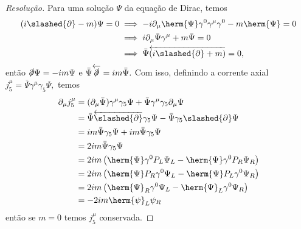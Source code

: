 \begin{proof}[Resolução]
    Para uma solução \(\Psi\) da equação de Dirac, temos
    \begin{align*}
        (i \slashed{\partial} - m) \Psi = 0 &\implies -i \partial_\mu \herm{\Psi} \gamma^0\gamma^\mu\gamma^0 - m \herm{\Psi} = 0\\
                                            &\implies i \partial_\mu \bar{\Psi} \gamma^\mu + m \bar{\Psi} = 0\\
                                            &\implies \bar{\Psi}\overleftarrow{(i \slashed{\partial} + m)} = 0,
    \end{align*}
    então \(\slashed{\partial} \Psi = -im \Psi\) e \(\bar{\Psi} \overleftarrow{\slashed{\partial}} = i m \bar{\Psi}.\) Com isso, definindo a corrente axial \(j_5^\mu = \bar{\Psi} \gamma^\mu \gamma_5 \Psi,\) temos
    \begin{align*}
        \partial_\mu j_5^\mu &= (\partial_\mu \bar{\Psi}) \gamma^\mu \gamma_5 \Psi + \bar{\Psi} \gamma^\mu \gamma_5 \partial_\mu \Psi\\
                             &= \bar{\Psi} \overleftarrow{\slashed{\partial}} \gamma_5 \Psi - \bar{\Psi} \gamma_5 \slashed{\partial} \Psi\\
                             &= i m \bar{\Psi} \gamma_5 \Psi + i m \bar{\Psi} \gamma_5 \Psi\\
                             &= 2im \bar{\Psi} \gamma_5 \Psi\\
                             &= 2im \left(\herm{\Psi}\gamma^0 P_L\Psi_L - \herm{\Psi} \gamma^0 P_R \Psi_R\right)\\
                             &= 2im \left(\herm{\Psi} P_R \gamma^0 \Psi_L - \herm{\Psi} P_L \gamma^0 \Psi_R\right)\\
                             &= 2im \left(\herm{\Psi}_R \gamma^0 \Psi_L - \herm{\Psi}_L \gamma^0 \Psi_R\right)\\
                             &= -2im \herm{\psi}_L \psi_R
    \end{align*}
    então se \(m = 0\) temos \(j_5^\mu\) conservada.
\end{proof}
